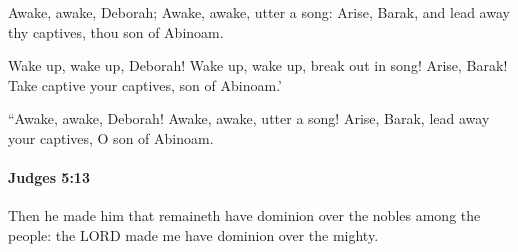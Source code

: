 			\begin{versebox}
					\item[BHS] 
					\item[ASV] Awake, awake, Deborah; Awake, awake, utter a song: Arise, Barak, and lead away thy captives, thou son of Abinoam.
					\item[NIV] Wake up, wake up, Deborah! Wake up, wake up, break out in song! Arise, Barak! Take captive your captives, son of Abinoam.’
					\item[NRSV] “Awake, awake, Deborah! Awake, awake, utter a song! Arise, Barak, lead away your captives, O son of Abinoam.
			\end{versebox}

		\paragraph{Judges 5:13} %
			\label{JUDGES-5-13}

			Then he made him that remaineth have dominion over the nobles among the people: the LORD made me have dominion over the mighty.

